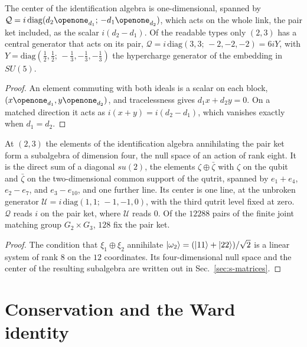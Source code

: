 \begin{lemma}
\label{lem:s-center}
The center of the identification algebra is one-dimensional, spanned by $\mathcal{Q}=i\,\mathrm{diag}(d_{2}\openone_{d_{1}};\,-d_{1}\openone_{d_{2}})$, which acts on the whole link, the pair ket included, as the scalar $i(d_{2}-d_{1})$. Of the readable types only $(2,3)$ has a central generator that acts on its pair, $\mathcal{Q}=i\,\mathrm{diag}(3,3;\,-2,-2,-2)=6iY$, with $Y=\mathrm{diag}(\tfrac{1}{2},\tfrac{1}{2};\,-\tfrac{1}{3},-\tfrac{1}{3},-\tfrac{1}{3})$ the hypercharge generator of the embedding in $SU(5)$.
\end{lemma}
\begin{proof}
An element commuting with both ideals is a scalar on each block, $(x\openone_{d_{1}},y\openone_{d_{2}})$, and tracelessness gives $d_{1}x+d_{2}y=0$. On a matched direction it acts as $i(x+y)=i(d_{2}-d_{1})$, which vanishes exactly when $d_{1}=d_{2}$.
\end{proof}

\begin{theorem}
\label{thm:s-stabilizer}
At $(2,3)$ the elements of the identification algebra annihilating the pair ket form a subalgebra of dimension four, the null space of an action of rank eight. It is the direct sum of a diagonal $su(2)$, the elements $\zeta\oplus\bar{\zeta}$ with $\zeta$ on the qubit and $\bar{\zeta}$ on the two-dimensional common support of the qutrit, spanned by $e_{1}+e_{4}$, $e_{2}-e_{7}$, and $e_{3}-e_{10}$, and one further line. Its center is one line, at the unbroken generator $\mathcal{U}=i\,\mathrm{diag}(1,1;\,-1,-1,0)$, with the third qutrit level fixed at zero. $\mathcal{Q}$ reads $i$ on the pair ket, where $\mathcal{U}$ reads $0$. Of the $12288$ pairs of the finite joint matching group $G_{2}\times G_{3}$, $128$ fix the pair ket.
\end{theorem}
\begin{proof}
The condition that $\xi_{1}\oplus\xi_{2}$ annihilate $|\omega_{2}\rangle=(|11\rangle+|22\rangle)/\sqrt{2}$ is a linear system of rank $8$ on the $12$ coordinates. Its four-dimensional null space and the center of the resulting subalgebra are written out in Sec.~\ref{sec:s-matrices}.
\end{proof}

\section{Conservation and the Ward identity}
\label{sec:s-ward}

